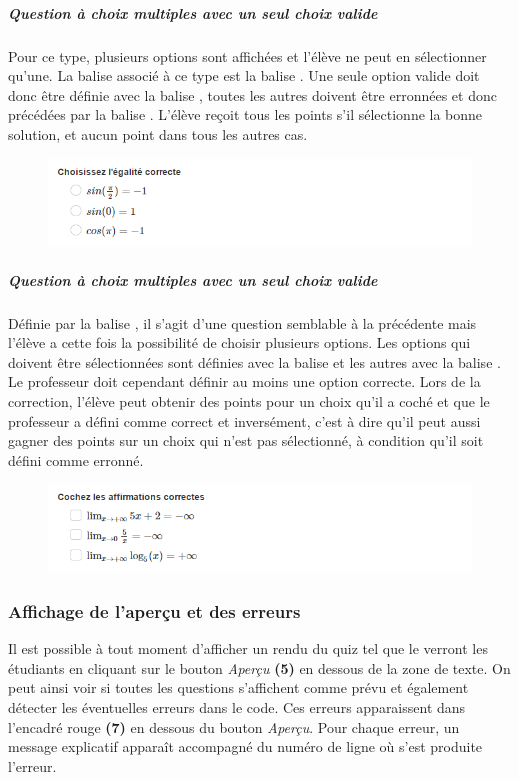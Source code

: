 \documentclass[a4,10pt,french]{sphinxmanual}
\begin{document}
\subparagraph{Question à choix multiples avec un seul choix valide}
\label{doc-user:question-a-choix-multiples-avec-un-seul-choix-valide}
Pour ce type, plusieurs options sont affichées et l'élève ne peut en sélectionner qu'une. La balise associé à ce type est la balise \code{**}. Une seule option valide doit donc être définie avec la balise \code{=}, toutes les autres doivent être erronnées et donc précédées par la balise \code{*}. L'élève reçoit tous les points s'il sélectionne la bonne solution, et aucun point dans tous les autres cas.
\begin{figure}[htbp]
\centering

\includegraphics{radio.png}
\end{figure}


\subparagraph{Question à choix multiples avec un seul choix valide}
\label{doc-user:id1}
Définie par la balise \code{\#\#}, il s'agit d'une question semblable à la précédente mais l'élève a cette fois la possibilité de choisir plusieurs options. Les options qui doivent être sélectionnées sont définies avec la balise \code{=} et les autres avec la balise \code{*}. Le professeur doit cependant définir au moins une option correcte. Lors de la correction, l'élève peut obtenir des points pour un choix qu'il a coché et que le professeur a défini comme correct et inversément, c'est à dire qu'il peut aussi gagner des points sur un choix qui n'est pas sélectionné, à condition qu'il soit défini comme erronné.
\begin{figure}[htbp]
\centering

\includegraphics{checkbox.png}
\end{figure}


\subsubsection{Affichage de l'aperçu et des erreurs}
\label{doc-user:affichage-de-l-apercu-et-des-erreurs}
Il est possible à tout moment d'afficher un rendu du quiz tel que le verront les étudiants en cliquant sur le bouton \emph{Aperçu} \textbf{(5)} en dessous de la zone de texte. On peut ainsi voir si toutes les questions s'affichent comme prévu et également détecter les éventuelles erreurs dans le code. Ces erreurs apparaissent dans l'encadré rouge \textbf{(7)} en dessous du bouton \emph{Aperçu}. Pour chaque erreur, un message explicatif apparaît accompagné du numéro de ligne où s'est produite l'erreur.
\end{document}
